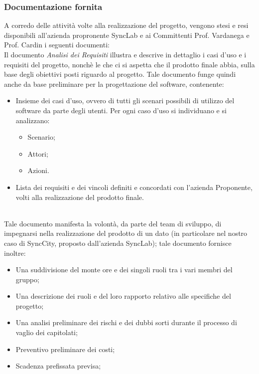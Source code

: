 \subsubsection{Documentazione fornita}
A corredo delle attività volte alla realizzazione del progetto, vengono stesi e resi disponibili
all'azienda propronente SyncLab e ai Committenti Prof. Vardanega e Prof. Cardin i seguenti documenti:
 \label{sec:ar1}\\
Il documento \textit{Analisi dei Requisiti }illustra e descrive in dettaglio i casi d'uso e i requisiti del progetto, nonchè le  che ci si aspetta che il prodotto finale abbia, sulla base degli obiettivi posti riguardo al progetto. Tale documento funge quindi anche da base preliminare per la progettazione del software, contenente:
\begin{itemize}
    \item Insieme dei casi d'uso, ovvero di tutti gli scenari possibili di utilizzo del software da
        parte degli utenti. Per ogni caso d'uso si individuano e si analizzano: 
    \begin{itemize}
        \item Scenario;
        \item Attori;
        \item Azioni.
    \end{itemize} 
    \item Lista dei requisiti e dei vincoli definiti e concordati con l'azienda Proponente, volti alla realizzazione del prodotto finale.
\end{itemize}

\\
Tale documento manifesta la volontà, da parte del team di sviluppo, di impegnarsi nella realizzazione del prodotto di un dato  (in particolare nel nostro caso di SyncCity, proposto dall'azienda SyncLab); tale documento fornisce inoltre:
\begin{itemize}
    \item Una suddivisione del monte ore e dei singoli ruoli tra i vari membri del gruppo;
    \item Una descrizione dei ruoli e del loro rapporto relativo alle specifiche del progetto;
    \item Una analisi preliminare dei rischi e dei dubbi sorti durante il processo di vaglio dei capitolati;
    \item Preventivo preliminare dei costi;
    \item Scadenza prefissata previsa;
\end{itemize}

